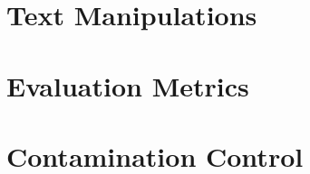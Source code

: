\section{Text Manipulations}
\label{sec:manipulations}


\section{Evaluation Metrics}
\label{sec:metrics}


\section{Contamination Control}
\label{sec:contamination_control}

